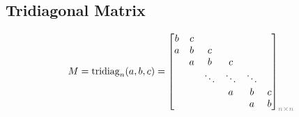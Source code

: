 \subsection{Tridiagonal Matrix}
\begin{align*}
    M = \mathrm{tridiag}_{n}(a, b, c) =
    \begin{bmatrix}
        b & c &        &        &        &   \\
        a & b & c      &        &        &   \\
        & a & b      & c      &        &   \\
        &   & \ddots & \ddots & \ddots &   \\
        &   &        & a      & b      & c \\
        &   &        &        & a      & b
    \end{bmatrix}_{\color{gray}n\times n}
\end{align*}
